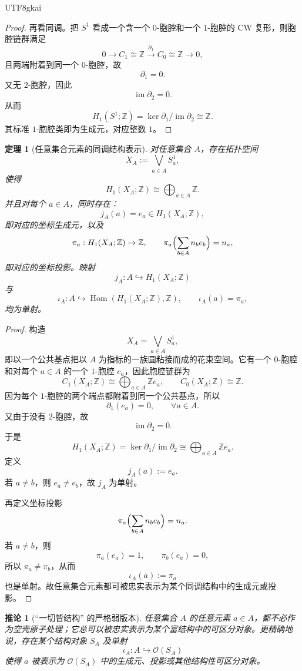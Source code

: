 \documentclass[12pt]{article}
\newtheorem{theorem}{定理}[section]
\newtheorem{corollary}{推论}[section]
\newcommand{\ZZ}{\mathbb{Z}}
\begin{document}
\begin{CJK*}{UTF8}{gkai}
\begin{proof}
再看同调。把 $S^1$ 看成一个含一个 $0$-胞腔和一个 $1$-胞腔的 CW 复形，则胞腔链群满足
\[
0\to C_1\cong \ZZ\xrightarrow{\partial_1}C_0\cong \ZZ\to 0,
\]
且两端附着到同一个 $0$-胞腔，故
\[
\partial_1=0.
\]
又无 $2$-胞腔，因此
\[
\operatorname{im}\partial_2=0.
\]
从而
\[
H_1(S^1;\ZZ)=\ker\partial_1/\operatorname{im}\partial_2\cong \ZZ.
\]
其标准 $1$-胞腔类即为生成元，对应整数 $1$。
\end{proof}

\begin{theorem}[任意集合元素的同调结构表示]\label{thm:allstructure}
对任意集合 $A$，存在拓扑空间
\[
X_A:=\bigvee_{a\in A}S_a^1,
\]
使得
\[
H_1(X_A;\ZZ)\cong \bigoplus_{a\in A}\ZZ.
\]
并且对每个 $a\in A$，同时存在：
\[
j_A(a)=e_a\in H_1(X_A;\ZZ),
\]
即对应的坐标生成元，以及
\[
\pi_a:H_1(X_A;\ZZ)\to \ZZ,
\qquad
\pi_a\Bigl(\sum_{b\in A}n_be_b\Bigr)=n_a,
\]
即对应的坐标投影。映射
\[
j_A:A\hookrightarrow H_1(X_A;\ZZ)
\]
与
\[
\iota_A:A\hookrightarrow \operatorname{Hom}(H_1(X_A;\ZZ),\ZZ),
\qquad
\iota_A(a)=\pi_a,
\]
均为单射。
\end{theorem}

\begin{proof}
构造
\[
X_A=\bigvee_{a\in A}S_a^1,
\]
即以一个公共基点把以 $A$ 为指标的一族圆粘接而成的花束空间。它有一个 $0$-胞腔和对每个 $a\in A$ 的一个 $1$-胞腔 $e_a$，因此胞腔链群为
\[
C_1(X_A;\ZZ)\cong \bigoplus_{a\in A}\ZZ e_a,
\qquad
C_0(X_A;\ZZ)\cong \ZZ.
\]
因为每个 $1$-胞腔的两个端点都附着到同一个公共基点，所以
\[
\partial_1(e_a)=0,
\qquad \forall a\in A.
\]
又由于没有 $2$-胞腔，故
\[
\operatorname{im}\partial_2=0.
\]
于是
\[
H_1(X_A;\ZZ)=\ker\partial_1/\operatorname{im}\partial_2\cong \bigoplus_{a\in A}\ZZ e_a.
\]
定义
\[
j_A(a):=e_a.
\]
若 $a\neq b$，则 $e_a\neq e_b$，故 $j_A$ 为单射。

再定义坐标投影
\[
\pi_a\Bigl(\sum_{b\in A}n_be_b\Bigr)=n_a.
\]
若 $a\neq b$，则
\[
\pi_a(e_a)=1,\qquad \pi_b(e_a)=0,
\]
所以 $\pi_a\neq\pi_b$，从而
\[
\iota_A(a):=\pi_a
\]
也是单射。故任意集合元素都可被忠实表示为某个同调结构中的生成元或投影。
\end{proof}

\begin{corollary}[``一切皆结构'' 的严格弱版本]\label{cor:weakstructure}
任意集合 $A$ 的任意元素 $a\in A$，都不必作为空壳原子处理；它总可以被忠实表示为某个富结构中的可区分对象。更精确地说，存在某个结构对象 $S_A$ 及单射
\[
\iota_A:A\hookrightarrow \mathcal O(S_A)
\]
使得 $a$ 被表示为 $\mathcal O(S_A)$ 中的生成元、投影或其他结构性可区分对象。
\end{corollary}


\end{CJK*}
\end{document}

